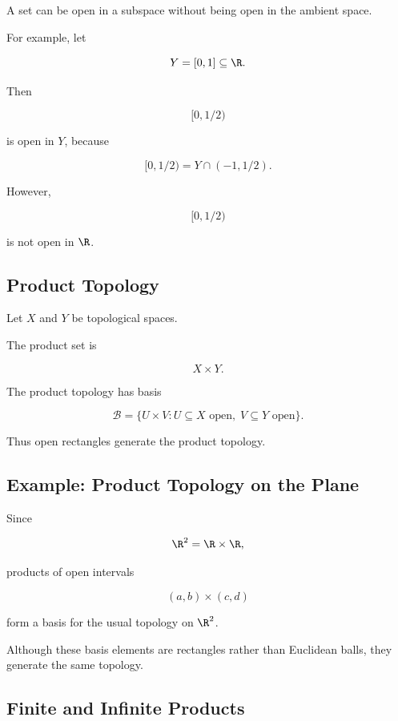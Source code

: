 A set can be open in a subspace without being open in the ambient space.

For example, let

\[
Y=[0,1]\subseteq\R.
\]

Then

\[
[0,1/2)
\]

is open in \(Y\), because

\[
\boxed{
[0,1/2)
=
Y\cap(-1,1/2).
}
\]

However,

\[
[0,1/2)
\]

is not open in \(\R\).

\subsection{Product Topology}
\label{subsec:product-topology}

Let \(X\) and \(Y\) be topological spaces.

The product set is

\[
X\times Y.
\]

The product topology has basis

\[
\boxed{
\mathcal{B}
=
\{
U\times V:
U\subseteq X\text{ open},
\;
V\subseteq Y\text{ open}
\}.
}
\]

Thus open rectangles generate the product topology.

\subsection{Example: Product Topology on the Plane}
\label{subsec:product-topology-plane}

Since

\[
\R^2
=
\R\times\R,
\]

products of open intervals

\[
(a,b)\times(c,d)
\]

form a basis for the usual topology on \(\R^2\).

Although these basis elements are rectangles rather than Euclidean balls,
they generate the same topology.

\subsection{Finite and Infinite Products}
\label{subsec:finite-infinite-products}

